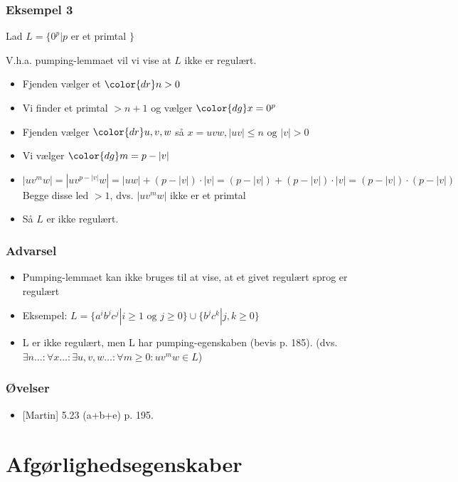 \begin{frame}
\frametitle{Eksempel 3}
Lad $L = \{0^p | p $ er et primtal $ \}$

V.h.a. pumping-lemmaet vil vi vise at $L$ ikke er regulært.

\begin{itemize}[<+->]
\item Fjenden vælger et ${\color{dr}n}> 0$
\item Vi finder et primtal $>n+1$ og vælger ${\color{dg}x=0^p}$
\item Fjenden vælger ${\color{dr}u,v,w}$ så $x=uvw, |uv|\leq n \text{ og } |v| > 0$
\item Vi vælger ${\color{dg}m=p-|v|}$
\item $|uv^mw| = |uv^{p-|v|}w|=|uw|+(p-|v|)\cdot |v| = (p-|v|) + (p-|v|)\cdot |v|
  =(p-|v|)\cdot(p-|v|)$ Begge disse led $>1$, dvs. $|uv^mw|$ ikke er et primtal
\item Så $L$ er \alert{ikke} regulært.
\end{itemize}
\end{frame}

\begin{frame}
\frametitle{Advarsel}
\begin{itemize}[<+->]
\item  Pumping-lemmaet kan \alert{ikke} bruges til at vise, at  
et givet regulært sprog er regulært 
\item Eksempel: 
 $L = \{ a^ib^jc^j | i\geq 1\text{ og }j\geq 0 \} \cup \{ b^jc^k | j,k\geq 0 \}$
\item L er ikke regulært, men L har pumping-egenskaben (bevis p. 185).
(dvs. $\exists n\ldots:  \forall x\ldots:  \exists u,v,w\ldots:  \forall m\geq 0: uv^mw \in L$)
\end{itemize}
\end{frame}
\begin{frame}
\frametitle{Øvelser}
\begin{itemize}
\item{} [Martin] 5.23 (a+b+e) p. 195.
\end{itemize}
\end{frame}
\section{Afgørlighedsegenskaber}

